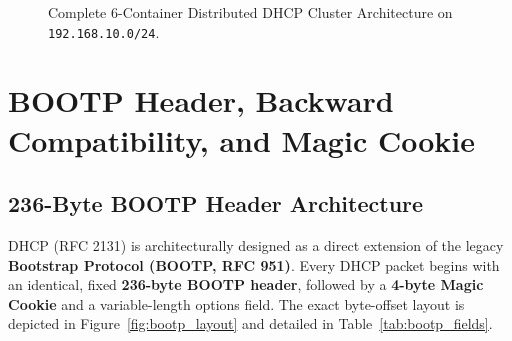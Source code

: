\documentclass[11pt,a4paper]{article}
\begin{document}
\begin{figure}[H]
{%
}
\caption{Complete 6-Container Distributed DHCP Cluster Architecture on \texttt{192.168.10.0/24}.}
\label{fig:arch_png}
\end{figure}

\section{BOOTP Header, Backward Compatibility, and Magic Cookie}

\subsection{236-Byte BOOTP Header Architecture}
DHCP (RFC 2131) is architecturally designed as a direct extension of the legacy \textbf{Bootstrap Protocol (BOOTP, RFC 951)}. Every DHCP packet begins with an identical, fixed \textbf{236-byte BOOTP header}, followed by a \textbf{4-byte Magic Cookie} and a variable-length options field. The exact byte-offset layout is depicted in Figure~\ref{fig:bootp_layout} and detailed in Table~\ref{tab:bootp_fields}.
\end{document}
